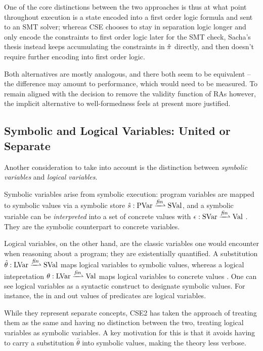 {One of the core distinctions between the two approaches is thus at what point throughout execution is a state encoded into a first order logic formula and sent to an SMT solver; whereas CSE chooses to stay in separation logic longer and only encode the constraints to first order logic later for the SMT check, Sacha's thesis instead keeps accumulating the constraints in $\hat \pi$ directly, and then doesn't require further encoding into first order logic. 

Both alternatives are mostly analogous, and there both seem to be equivalent -- the difference may amount to performance, which would need to be measured. To remain aligned with the decision to remove the validity function of RAs however, the implicit alternative to well-formedness feels at present more justified.
}

\subsection{Symbolic and Logical Variables: United or Separate}

Another consideration to take into account is the distinction between \emph{symbolic variables} and \emph{logical variables}. 

Symbolic variables arise from symbolic execution: program variables are mapped to symbolic values via a symbolic store $\hat s:\text{PVar}\finmap \text{SVal}$, and a symbolic variable can be \emph{interpreted} into a set of concrete values with $\epsilon:\text{SVar}\finmap\text{Val}$ \cite{cse1}. They are the symbolic counterpart to concrete variables.

Logical variables, on the other hand, are the classic variables one would encounter when reasoning about a program; they are existentially quantified. A substitution ${\hat\theta:\text{LVar}\finmap\text{SVal}}$ maps logical variables to symbolic values, whereas a logical intepretation $\theta:\text{LVar}\finmap\text{Val}$ maps logical variables to concrete values \cite{cse1}. One can see logical variables as a syntactic construct to designate symbolic values. For instance, the in and out values of predicates are logical variables.

While they represent separate concepts, CSE2 has taken the approach of treating them as the same and having no distinction between the two, treating logical variables as symbolic variables. A key motivation for this is that it avoids having to carry a substitution $\hat\theta$ into symbolic values, making the theory less verbose.

